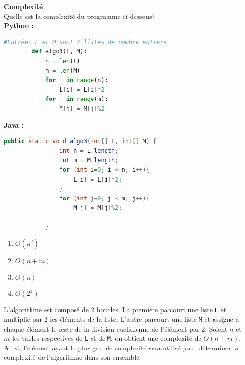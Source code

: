 \begin{Exercice}[10 minutes] \textbf{Complexité} \\
    Quelle est la complexité du programme ci-dessous?\\
        \textbf{Python :}
        \begin{lstlisting}[language=Python]
        #Entrée: L et M sont 2 listes de nombre entiers
        def algo3(L, M):
            n = len(L)
            m = len(M)
            for i in range(n):
                L[i] = L[i]*2
            for j in range(m):
                M[j] = M[j]%2
        \end{lstlisting}
        
        \textbf{Java :}
        \begin{lstlisting}[language=Java]
            public static void algo3(int[] L, int[] M) {
                int n = L.length;
                int m = M.length;
                for (int i=0; i < n; i++){
                    L[i] = L[i]*2;
                }
                for (int j=0; j < m; j++){
                    M[j] = M[j]%2;
                }
            }
        \end{lstlisting}

        \begin{enumerate}
            \item $O(n^2)$
            \item $O(n + m)$
            \item $O(n)$
            \item $O(2^n)$
        \end{enumerate}

        \begin{solution}
        L'algorithme est composé de 2 boucles. La première parcourt une liste \lstinline{L} et multiplie par 2 les éléments de la liste. 
        L'autre parcourt une liste \lstinline{M} et assigne à chaque élément le reste de la division euclidienne de l'élément par 2. 
        Soient $n$ et $m$ les tailles respectives de \lstinline{L} et de \lstinline{M}, on obtient une complexité de $O(n + m)$. 
        Ainsi, l'élément ayant la plus grande complexité sera utilisé pour déterminer la complexité de l'algorithme dans son ensemble.
        \end{solution}
\end{Exercice}

